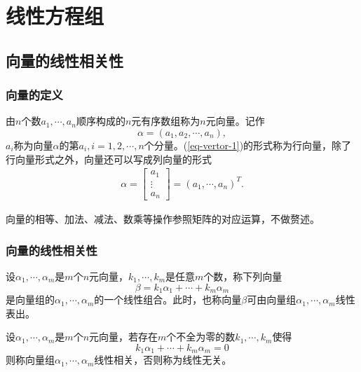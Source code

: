 \chapter{线性方程组}

\section{向量的线性相关性}

\subsection{向量的定义}

\begin{definition}
    \label{def-vector}
    由$n$个数$a_1,\cdots,a_n$顺序构成的$n$元有序数组称为$n$元向量。记作
    \begin{equation}
        \alpha=(a_1,a_2,\cdots,a_n),\label{eq-vertor-1}
    \end{equation}
    $a_i$称为向量$\alpha$的第$a_i,i=1,2,\cdots,n$个分量。(\ref{eq-vertor-1})的形式称为行向量，除了行向量形式之外，向量还可以写成列向量的形式
    \begin{eqnarray}
        \alpha=\begin{bmatrix}
            a_1\\\vdots\\a_n
        \end{bmatrix}=(a_1,\cdots,a_n)^T.
    \end{eqnarray}
\end{definition}

向量的相等、加法、减法、数乘等操作参照矩阵的对应运算，不做赘述。

\subsection{向量的线性相关性}

\begin{definition}
    \label{def-linear-composition}
    设$\alpha_1,\cdots,\alpha_m$是$m$个$n$元向量，$k_1,\cdots,k_m$是任意$m$个数，称下列向量
    \[ \beta=k_1\alpha_1+\cdots+k_m\alpha_m \]
    是向量组的$\alpha_1,\cdots,\alpha_m$的一个线性组合。此时，也称向量$\beta$可由向量组$\alpha_1,\cdots,\alpha_m$线性表出。
\end{definition}

\begin{definition}
    \label{def-linear-relation}
    设$\alpha_1,\cdots,\alpha_m$是$m$个$n$元向量，若存在$m$个不全为零的数$k_1,\cdots,k_m$使得
    \begin{equation}
        k_1\alpha_1+\cdots+k_m\alpha_m=0\label{eq-linear-dependence}
    \end{equation}
    则称向量组$\alpha_1,\cdots,\alpha_m$线性相关，否则称为线性无关。
\end{definition}

